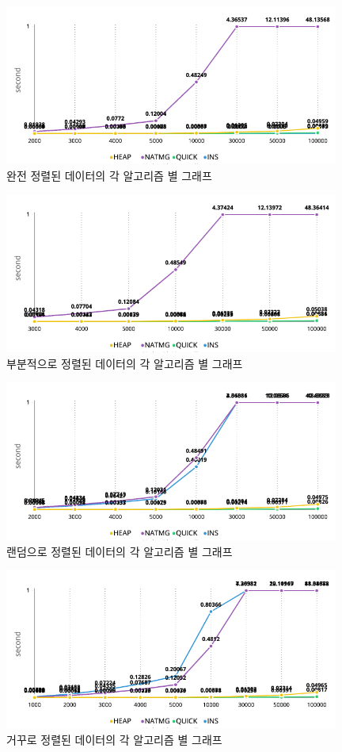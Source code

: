 \documentclass{article}
\begin{document}
\begin{figure}
\centering
   \includegraphics[width=11cm]{sorted.jpg}
   \hfil
\caption{완전 정렬된 데이터의 각 알고리즘 별 그래프}
\label{sorted}
\end{figure}


\begin{figure}
\centering
   \includegraphics[width=11cm]{partially_sorted.jpg}
   \hfil
\caption{부분적으로 정렬된 데이터의 각 알고리즘 별 그래프}
\label{part_sorted}
\end{figure}


\begin{figure}
\centering
   \includegraphics[width=11cm]{random.jpg}
   \hfil
\caption{랜덤으로 정렬된 데이터의 각 알고리즘 별 그래프}
\label{random}
\end{figure}

\begin{figure}
\centering
   \includegraphics[width=11cm]{decreasing.jpg}
   \hfil
\caption{거꾸로 정렬된 데이터의 각 알고리즘 별 그래프}
\label{decreasing}
\end{figure}
\end{document}
